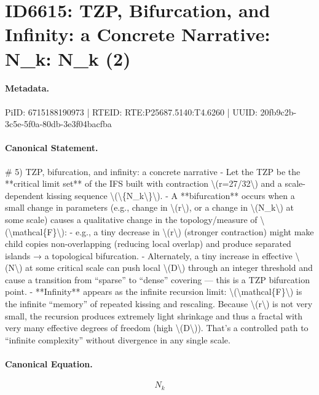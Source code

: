 \section*{ID6615: TZP, Bifurcation, and Infinity: a Concrete Narrative: N\_k: N\_k (2)}
\paragraph{Metadata.}
PiID: 6715188190973 | RTEID: RTE:P25687.5140:T4.6260 | UUID: 20fb9c2b-3c5e-5f0a-80db-3e3f04bacfba

\paragraph{Canonical Statement.}
\# 5) TZP, bifurcation, and infinity: a concrete narrative - Let the TZP be the **critical limit set** of the IFS built with contraction \textbackslash{}(r=27/32\textbackslash{}) and a scale-dependent kissing sequence \textbackslash{}(\textbackslash{}\{N\_k\textbackslash{}\}\textbackslash{}). - A **bifurcation** occurs when a small change in parameters (e.g., change in \textbackslash{}(r\textbackslash{}), or a change in \textbackslash{}(N\_k\textbackslash{}) at some scale) causes a qualitative change in the topology/measure of \textbackslash{}(\textbackslash{}mathcal\{F\}\textbackslash{}): - e.g., a tiny decrease in \textbackslash{}(r\textbackslash{}) (stronger contraction) might make child copies non-overlapping (reducing local overlap) and produce separated islands → a topological bifurcation. - Alternately, a tiny increase in effective \textbackslash{}(N\textbackslash{}) at some critical scale can push local \textbackslash{}(D\textbackslash{}) through an integer threshold and cause a transition from “sparse” to “dense” covering — this is a TZP bifurcation point. - **Infinity** appears as the infinite recursion limit: \textbackslash{}(\textbackslash{}mathcal\{F\}\textbackslash{}) is the infinite “memory” of repeated kissing and rescaling. Because \textbackslash{}(r\textbackslash{}) is not very small, the recursion produces extremely light shrinkage and thus a fractal with very many effective degrees of freedom (high \textbackslash{}(D\textbackslash{})). That’s a controlled path to “infinite complexity” without divergence in any single scale.

\paragraph{Canonical Equation.}
\[
N_k
\]

